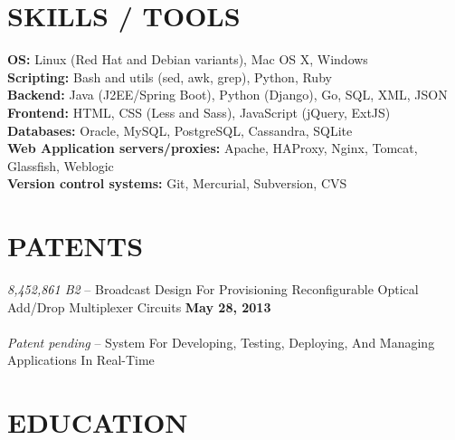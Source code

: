 \documentclass[margin,line]{resume}
\begin{document}
\begin{resume}
    \vspace{-1mm}

\sectionline

    \section{\mysidestyle \textbf{\large{S}\small{KILLS} / \large{T}\small{OOLS}}}
    \textbf{OS:} Linux (Red Hat and Debian variants), Mac OS X, Windows \\
    \textbf{Scripting:} Bash and utils (sed, awk, grep), Python, Ruby\\
    \textbf{Backend:} Java (J2EE/Spring Boot), Python (Django), Go, SQL, XML, JSON\\
    \textbf{Frontend:} HTML, CSS (Less and Sass), JavaScript (jQuery, ExtJS)\\
    \textbf{Databases:} Oracle, MySQL, PostgreSQL, Cassandra, SQLite\\
    \textbf{Web Application servers/proxies:} Apache, HAProxy, Nginx, Tomcat, Glassfish, Weblogic\\
    \textbf{Version control systems:} Git, Mercurial, Subversion, CVS\\

\sectionline

    \section{\mysidestyle \textbf{\large{P}\small{ATENTS}}}
    \textsl{8,452,861 B2} -- Broadcast Design For Provisioning Reconfigurable Optical Add/Drop Multiplexer Circuits \hfill \textbf{May 28, 2013}\\\\
    \textsl{Patent pending} -- System For Developing, Testing, Deploying, And Managing Applications In Real-Time\\
    \vspace{-4mm}

\sectionline


    \section{\mysidestyle \textbf{\large{E}\small{DUCATION}}}


\end{resume}
\end{document}
